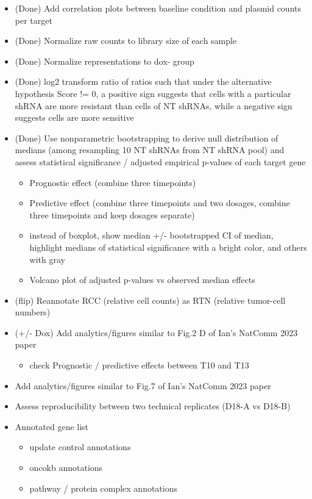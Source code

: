 \documentclass[11pt]{article}
\providecommand{\tightlist}{%
      \setlength{\itemsep}{0pt}\setlength{\parskip}{0pt}}
\begin{document}
\begin{itemize}
\tightlist
\item
  (Done) Add correlation plots between baseline condition and plasmid
  counts per target
\item
  (Done) Normalize raw counts to library size of each sample
\item
  (Done) Normalize representations to dox- group
\item
  (Done) log2 transform ratio of ratios such that under the alternative
  hypothesis Score != 0, a positive sign suggests that cells with a
  particular shRNA are more resistant than cells of NT shRNAs, while a
  negative sign suggests cells are more sensitive
\item
  (Done) Use nonparametric bootstrapping to derive null distribution of
  medians (among resampling 10 NT shRNAs from NT shRNA pool) and assess
  statistical significance / adjusted empirical p-values of each target
  gene

  \begin{itemize}
  \tightlist
  \item
    Prognostic effect (combine three timepoints)
  \item
    Predictive effect (combine three timepoints and two dosages, combine
    three timepoints and keep dosages separate)
  \item
    instead of boxplot, show median +/- bootstrapped CI of median,
    highlight medians of statistical significance with a bright color,
    and others with gray
  \item
    Volcano plot of adjusted p-values vs observed median effects
  \end{itemize}
\item
  (flip) Reannotate RCC (relative cell counts) as RTN (relative
  tumor-cell numbers)
\item
  (+/- Dox) Add analytics/figures similar to Fig.2 D of Ian's NatComm
  2023 paper

  \begin{itemize}
  \tightlist
  \item
    check Prognostic / predictive effects between T10 and T13
  \end{itemize}
\item
  Add analytics/figures similar to Fig.7 of Ian's NatComm 2023 paper
\item
  Assess reproducibility between two technical replicates (D18-A vs
  D18-B)
\item
  Annotated gene list

  \begin{itemize}
  \tightlist
  \item
    update control annotations
  \item
    oncokb annotations
  \item
    pathway / protein complex annotations
  \end{itemize}
\end{itemize}
\end{document}
